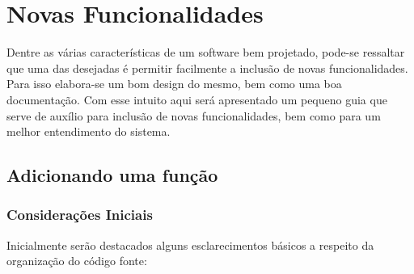 \chapter{Novas Funcionalidades}

Dentre as várias características de um software bem projetado, pode-se ressaltar que uma das desejadas é permitir facilmente a inclusão de novas funcionalidades. Para isso elabora-se um bom design do mesmo, bem como uma boa documentação. Com esse intuito aqui será apresentado um pequeno guia que serve de auxílio para inclusão de novas funcionalidades, bem como para um melhor entendimento do sistema.

\section{Adicionando uma função}

\subsection{Considerações Iniciais}

Inicialmente serão destacados alguns esclarecimentos básicos a respeito da organização do código fonte:

